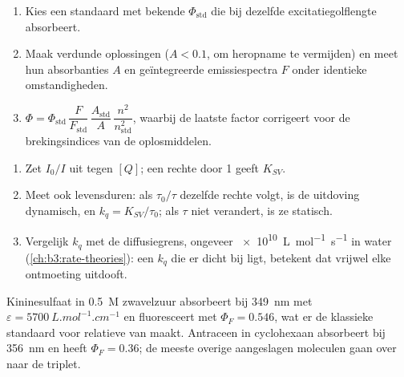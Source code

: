 \begin{method}\label{met:b3:electronic-spectroscopy:relative-yield}
\begin{enumerate}
  \item Kies een standaard met bekende $\Phi_{\mathrm{std}}$ die bij dezelfde
        excitatiegolflengte absorbeert.
  \item Maak verdunde oplossingen ($A < 0.1$, om heropname te vermijden) en
        meet hun absorbanties $A$ en geïntegreerde emissiespectra $F$
        onder identieke omstandigheden.
  \item $\Phi = \Phi_{\mathrm{std}}\,\dfrac{F}{F_{\mathrm{std}}}\,\dfrac{A_{\mathrm{std}}}{A}\,
        \dfrac{n^2}{n_{\mathrm{std}}^2}$, waarbij de laatste factor corrigeert
        voor de brekingsindices van de oplosmiddelen.
\end{enumerate}
\end{method}

\begin{method}\label{met:b3:electronic-spectroscopy:stern-volmer}
\begin{enumerate}
  \item Zet $I_0/I$ uit tegen $[Q]$; een rechte door 1 geeft $K_{SV}$.
  \item Meet ook levensduren: als $\tau_0/\tau$ dezelfde rechte volgt, is de
        uitdoving dynamisch, en $k_q = K_{SV}/\tau_0$; als $\tau$ niet
        verandert, is ze statisch.
  \item Vergelijk $k_q$ met de diffusiegrens, ongeveer \qty{e10}{L.mol^{-1}.s^{-1}} in
        water (\cref{ch:b3:rate-theories}): een $k_q$ die er dicht bij ligt,
        betekent dat vrijwel elke ontmoeting uitdooft.
\end{enumerate}
\end{method}

\begin{example}\label{ex:b3:electronic-spectroscopy:quinine}
Kininesulfaat in \qty{0.5}{M} zwavelzuur absorbeert bij \qty{349}{nm} met $\varepsilon =
\qty{5700}{L.mol^{-1}.cm^{-1}}$ en fluoresceert met $\Phi_F = 0.546$, wat er de
klassieke standaard voor relatieve  van maakt.
Antraceen in cyclohexaan
absorbeert bij \qty{356}{nm} en heeft $\Phi_F = 0.36$; de meeste overige
aangeslagen moleculen gaan over naar de triplet.
\end{example}

